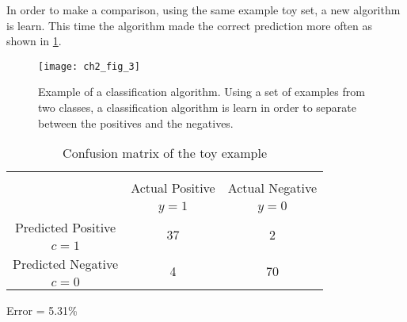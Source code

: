	In order to make a comparison, using the same example toy set, a new algorithm is learn. This 
time the algorithm made the correct prediction more often as shown in \figurename{ \ref{fig:ch2:2}}.

\begin{figure}[t!]
	\centering
	\texttt{[image: ch2\_fig\_3]}
	\caption{Example of a classification algorithm. Using a set of examples from two classes, a 
	classification algorithm is learn in order to separate between the positives and the negatives. }
	\label{fig:ch2:2}
\end{figure}

    	\begin{table}[!t]
		\centering
		\footnotesize
    \begin{tabular}{c|c|c}
      \multicolumn{3}{c}{}\\
			\multicolumn{1}{c|}{}  & Actual Positive& Actual Negative \\
			\multicolumn{1}{c|}{} & $y=1$& $y=0$ \\
			\hline
			Predicted Positive 		& \multirow{ 2}{*}{37} & \multirow{ 
			2}{*}{2} \\
			$c=1$ & &\\
			\hline
			Predicted Negative  	& \multirow{ 2}{*}{4} & \multirow{ 
			2}{*}{70} \\
			$c=0$ & &\\
		\end{tabular}
		\caption{Confusion matrix of the toy example}
		\label{tab:ch2:2}
  \end{table}  
  Error = 5.31\%
  
